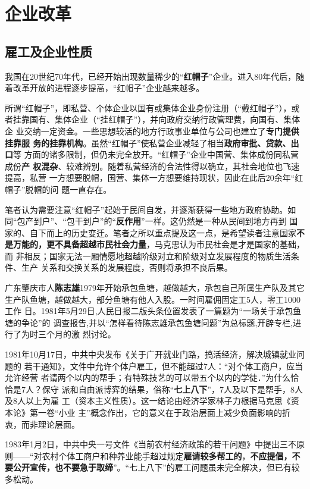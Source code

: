 \section{企业改革}

\subsection{雇工及企业性质}

我国在20世纪70年代，已经开始出现数量稀少的“\textbf{红帽子}”企业。进入80年代后，随
着改革开放的进程逐步提高，“红帽子”企业越来越多。

所谓“红帽子”，即私营、个体企业以国有或集体企业身份注册（“戴红帽子”），或
者挂靠国有、集体企业（“挂红帽子”），并向政府交纳行政管理费，向国有、集体企
业交纳一定资金。一些思想较活的地方行政事业单位与公司也建立了\textbf{专门提供挂靠服
  务的挂靠机构}。虽然“红帽子”使私营企业减轻了相当\textbf{政府审批、贷款、出口}等
方面的诸多限制，但仍未完全放开。“红帽子”企业中国营、集体成份同私营成份\textbf{产
  权混杂}、较难辨别。随着私营经济的合法性得以确立，其社会地位也飞速提高，私营
一方想要脱帽，国营、集体一方想要维持现状，因此在此后20余年“红帽子”脱帽的问
题一直存在。

笔者认为需要注意“红帽子”起始于民间自发，并逐渐获得一些地方政府协助。如
同“包产到户”、“包干到户”的“\textbf{反作用}”一样。这仍然是一种从民间到地方再到
国家的、自下而上的历史变迁。笔者之所以重点提及这一点，是希望读者注意国家\textbf{不
  是万能的，更不具备超越市民社会力量}，马克思认为市民社会是才是国家的基础，而
非相反；国家无法一厢情愿地超越阶级对立和阶级对立发展程度的物质生活条件、生产
关系和交换关系的发展程度，否则将承担不良后果。


广东肇庆市人\textbf{陈志雄}1979年开始承包鱼塘，越做越大，承包自己所属生产队及其它
生产队鱼塘，越做越大，部分鱼塘有他人入股。一时间雇佣固定工5人，零工1000工作
日。1981年5月29日,人民日报二版头条位置发表了一篇题为“一场关于承包鱼塘的争论”的
调查报告,并以“怎样看待陈志雄承包鱼塘问题”为总标题,开辟专栏,进行了为时三个月的激
烈讨论。

1981年10月17日，中共中央发布《关于广开就业门路，搞活经济，解决城镇就业问题的
若干通知》，文件中允许个体户雇工，但不能超过7人：“对个体工商户，应当允许经营
者请两个以内的帮手；有特殊技艺的可以带五个以内的学徒．”为什么恰恰是7人？保守
派和自由派博弈的结果，俗称“\textbf{七上八下}”，7人及以下是帮手，8人及8人以上为雇
工（资本主义性质）。这一结论由经济学家林子力根据马克思《资本论》第一卷“小业
主”概念作出，它的意义在于政治层面上减少负面影响的折衷，而非理论层面。

1983年1月2日，中共中央一号文件《当前农村经济政策的若干问题》中提出三不原
则——“对农村个体工商户和种养业能手超过规定\textbf{雇请较多帮工的}，\textbf{不应提倡，不
  要公开宣传，也不要急于取缔}”。“七上八下”的雇工问题虽未完全解决，但已有较
多松动。

